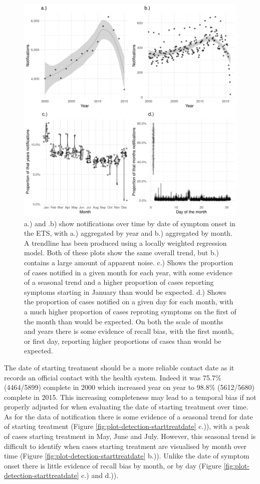 \documentclass[11pt,twoside]{bristolthesis}
\begin{document}
  \begin{figure}
  
  {\centering \includegraphics[width=0.8\linewidth]{chapters/tb-epi-england/figures/plot-detection-sympton} 
  
  }
  
  \caption{a.) and .b) show notifications over time by date of symptom onset in the ETS, with a.) aggregated by year and  b.) aggregated by month. A trendline has been produced using a locally weighted regression model. Both of these plots show the same overall trend, but b.) contains a large amount of apparent noise. c.) Shows the proportion of cases notified in a given month for each year, with some evidence of a seasonal trend and a higher proportion of cases reporting symptoms starting in January than would be expected. d.) Shows the proportion of cases notified on a given day for each month, with a much higher proportion of cases reproting symptoms on the first of the month than would be expected. On both the scale of months and years there is some evidence of recall bias, with the first month, or first day, reporting higher proportions of cases than would be expected.}\label{fig:plot-detection-sympton}
  \end{figure}
  The date of starting treatment should be a more reliable contact date as it records an official contact with the health system. Indeed it was 75.7\% (4464/5899) complete in 2000 which increased year on year to 98.8\% (5612/5680) complete in 2015. This increasing completeness may lead to a temporal bias if not properly adjusted for when evaluating the date of starting treatment over time. As for the data of notification there is some evidence of a seasonal trend for date of starting treatment (Figure \ref{fig:plot-detection-starttreatdate} c.)), with a peak of cases starting treatment in May, June and July. However, this seasonal trend is difficult to identify when cases starting treatment are visualised by month over time (Figure \ref{fig:plot-detection-starttreatdate} b.)). Unlike the date of symptom onset there is little evidence of recall bias by month, or by day (Figure \ref{fig:plot-detection-starttreatdate} c.) and d.)).
\end{document}
